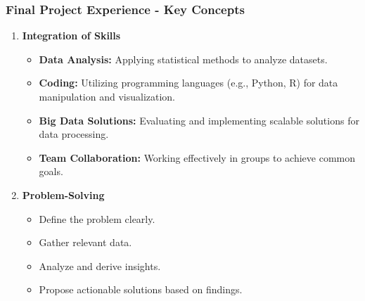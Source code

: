 \documentclass[aspectratio=169]{beamer}
\begin{document}
\begin{frame}[fragile]
    \frametitle{Final Project Experience - Key Concepts}
    \begin{enumerate}
        \item \textbf{Integration of Skills}
            \begin{itemize}
                \item \textbf{Data Analysis:} Applying statistical methods to analyze datasets.
                \item \textbf{Coding:} Utilizing programming languages (e.g., Python, R) for data manipulation and visualization.
                \item \textbf{Big Data Solutions:} Evaluating and implementing scalable solutions for data processing.
                \item \textbf{Team Collaboration:} Working effectively in groups to achieve common goals.
            \end{itemize}
        
        \item \textbf{Problem-Solving}
            \begin{itemize}
                \item Define the problem clearly.
                \item Gather relevant data.
                \item Analyze and derive insights.
                \item Propose actionable solutions based on findings.
            \end{itemize}
    \end{enumerate}
\end{frame}
\end{document}
